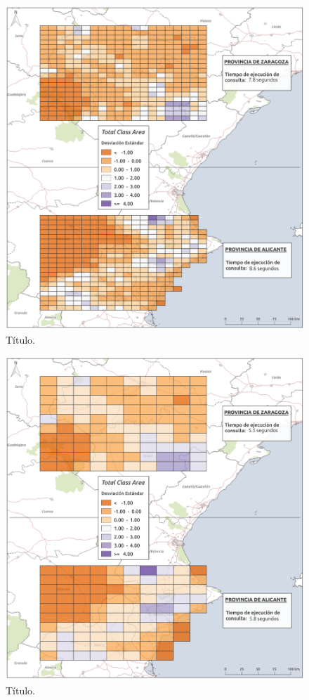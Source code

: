 \begin{figure}
\begin{center}
\includegraphics[width=\textwidth]{ResultadosyDiscusion/Figs/Results/c_25.png}
\caption{Título. \label{fig:c_25}}
\end{center}
\end{figure}

\begin{figure}
\begin{center}
\includegraphics[width=\textwidth]{ResultadosyDiscusion/Figs/Results/c_50.png}
\caption{Título. \label{fig:c_50}}
\end{center}
\end{figure}


